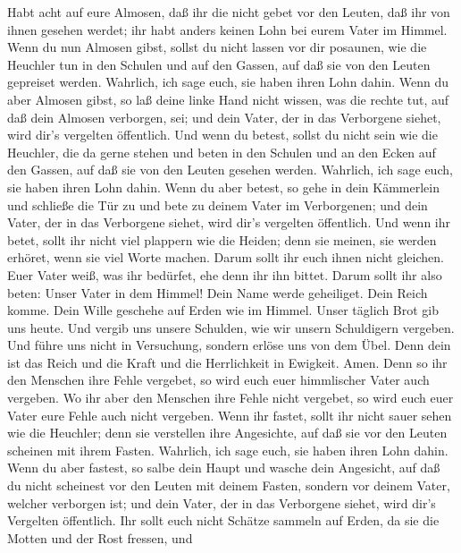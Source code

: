  Habt acht auf eure Almosen, daß ihr die nicht gebet vor den
Leuten, daß ihr von ihnen gesehen werdet; ihr habt anders keinen Lohn
bei eurem Vater im Himmel.  Wenn du nun Almosen gibst,
sollst du nicht lassen vor dir posaunen, wie die Heuchler tun in den
Schulen und auf den Gassen, auf daß sie von den Leuten gepreiset werden.
Wahrlich, ich sage euch, sie haben ihren Lohn dahin.  Wenn
du aber Almosen gibst, so laß deine linke Hand nicht wissen, was die
rechte tut,  auf daß dein Almosen verborgen, sei; und dein
Vater, der in das Verborgene siehet, wird dir's vergelten öffentlich.
 Und wenn du betest, sollst du nicht sein wie die Heuchler,
die da gerne stehen und beten in den Schulen und an den Ecken auf den
Gassen, auf daß sie von den Leuten gesehen werden. Wahrlich, ich sage
euch, sie haben ihren Lohn dahin.  Wenn du aber betest, so
gehe in dein Kämmerlein und schließe die Tür zu und bete zu deinem Vater
im Verborgenen; und dein Vater, der in das Verborgene siehet, wird dir's
vergelten öffentlich.  Und wenn ihr betet, sollt ihr nicht
viel plappern wie die Heiden; denn sie meinen, sie werden erhöret, wenn
sie viel Worte machen.  Darum sollt ihr euch ihnen nicht
gleichen. Euer Vater weiß, was ihr bedürfet, ehe denn ihr ihn bittet.
 Darum sollt ihr also beten: Unser Vater in dem Himmel! Dein
Name werde geheiliget.  Dein Reich komme. Dein Wille
geschehe auf Erden wie im Himmel.  Unser täglich Brot gib
uns heute.  Und vergib uns unsere Schulden, wie wir unsern
Schuldigern vergeben.  Und führe uns nicht in Versuchung,
sondern erlöse uns von dem Übel. Denn dein ist das Reich und die Kraft
und die Herrlichkeit in Ewigkeit. Amen.  Denn so ihr den
Menschen ihre Fehle vergebet, so wird euch euer himmlischer Vater auch
vergeben.  Wo ihr aber den Menschen ihre Fehle nicht
vergebet, so wird euch euer Vater eure Fehle auch nicht vergeben.
 Wenn ihr fastet, sollt ihr nicht sauer sehen wie die
Heuchler; denn sie verstellen ihre Angesichte, auf daß sie vor den
Leuten scheinen mit ihrem Fasten. Wahrlich, ich sage euch, sie haben
ihren Lohn dahin.  Wenn du aber fastest, so salbe dein
Haupt und wasche dein Angesicht,  auf daß du nicht
scheinest vor den Leuten mit deinem Fasten, sondern vor deinem Vater,
welcher verborgen ist; und dein Vater, der in das Verborgene siehet,
wird dir's Vergelten öffentlich.  Ihr sollt euch nicht
Schätze sammeln auf Erden, da sie die Motten und der Rost fressen, und
